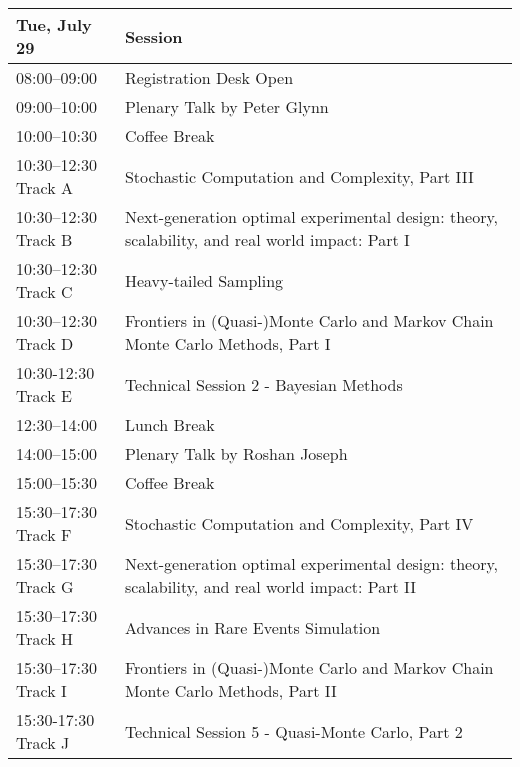 \begin{table}
\begin{tabularx}{\textwidth}{>{\hsize=0.5\hsize}X|>{\hsize=1.5\hsize}X}
\hline
\textbf{Tue, July 29} & \textbf{Session} \\
\hline
\cellcolor{\EmptyColor}08:00–09:00 & \cellcolor{\EmptyColor}Registration Desk Open \\
\cellcolor{\PlenaryColor}09:00–10:00 & \cellcolor{\PlenaryColor}Plenary Talk by Peter Glynn \\
\cellcolor{\EmptyColor}10:00–10:30 & \cellcolor{\EmptyColor}Coffee Break \\
\cellcolor{\SessionTitleColor}10:30–12:30 Track A & \cellcolor{\SessionTitleColor}Stochastic Computation and Complexity, Part III \\
\cellcolor{\SessionTitleColor}10:30–12:30 Track B & \cellcolor{\SessionTitleColor}Next-generation optimal experimental design: theory, scalability, and real world impact: Part I \\
\cellcolor{\SessionTitleColor}10:30–12:30 Track C & \cellcolor{\SessionTitleColor}Heavy-tailed Sampling \\
\cellcolor{\SessionTitleColor}10:30–12:30 Track D & \cellcolor{\SessionTitleColor}Frontiers in (Quasi-)Monte Carlo and Markov Chain Monte Carlo Methods, Part I \\
\cellcolor{\SessionLightColor}10:30-12:30 Track E & \cellcolor{\SessionLightColor}Technical Session 2 - Bayesian Methods \\
\cellcolor{\EmptyColor}12:30–14:00 & \cellcolor{\EmptyColor}Lunch Break \\
\cellcolor{\PlenaryColor}14:00–15:00 & \cellcolor{\PlenaryColor}Plenary Talk by Roshan Joseph \\
\cellcolor{\EmptyColor}15:00–15:30 & \cellcolor{\EmptyColor}Coffee Break \\
\cellcolor{\SessionTitleColor}15:30–17:30 Track F & \cellcolor{\SessionTitleColor}Stochastic Computation and Complexity, Part IV \\
\cellcolor{\SessionTitleColor}15:30–17:30 Track G & \cellcolor{\SessionTitleColor}Next-generation optimal experimental design: theory, scalability, and real world impact: Part II \\
\cellcolor{\SessionTitleColor}15:30–17:30 Track H & \cellcolor{\SessionTitleColor}Advances in Rare Events Simulation \\
\cellcolor{\SessionTitleColor}15:30–17:30 Track I & \cellcolor{\SessionTitleColor}Frontiers in (Quasi-)Monte Carlo and Markov Chain Monte Carlo Methods, Part II \\
\cellcolor{\SessionLightColor}15:30-17:30 Track J & \cellcolor{\SessionLightColor}Technical Session 5 - Quasi-Monte Carlo, Part 2 \\
\hline
\end{tabularx}
\end{table}

